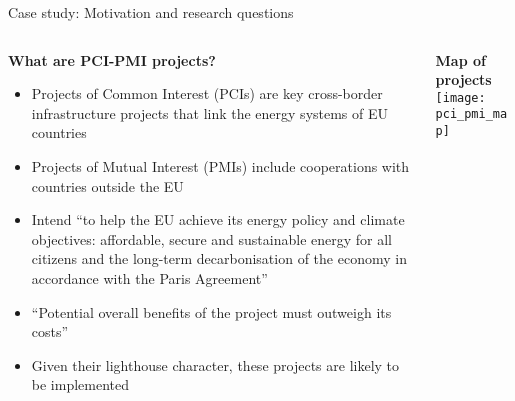 \documentclass[10pt,aspectratio=169,dvipsnames]{beamer}
\begin{document}
\begin{frame}{Case study: Motivation and research questions}
  \footnotesize

  \begin{columns}[T] %
    \begin{column}{.64\textwidth}
        \begin{minipage}[t][.45\textheight]{\linewidth}
            \begin{alertblock}{\textbf{What are PCI-PMI projects?}}
                \begin{itemize}
                  \item Projects of Common Interest (PCIs) are key cross-border infrastructure projects that link the energy systems of EU countries
                  \item Projects of Mutual Interest (PMIs) include cooperations with countries outside the EU
                  \item Intend ``to help the EU achieve its energy policy and climate objectives: affordable, secure and sustainable energy for all citizens and the long-term decarbonisation of the economy in accordance with the Paris Agreement''
                  \item ``Potential overall benefits of the project must outweigh its costs'' 
                  \item Given their lighthouse character, these projects are likely to be implemented
                \end{itemize}
            \end{alertblock}
        \end{minipage}
    \end{column}
    
    \begin{column}{.36\textwidth}
        \begin{minipage}[t][.45\textheight]{\linewidth}
            \begin{alertblock}{\textbf{Map of projects}}
              \centering
              \texttt{[image: pci\_pmi\_map]}
            \end{alertblock}
        \end{minipage}
    \end{column}

  \end{columns}

  \vspace{2.3cm}


\end{frame}
\end{document}
